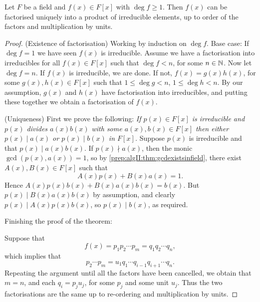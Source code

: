 \documentclass[10pt, a4paper]{article}
\begin{document}
\begin{theorem}
    Let $F$ be a field and $f(x) \in F[x]$ with $\deg{f} \geq 1$.
    Then $f(x)$ can be factorised uniquely into a product of irreducible elements,
    up to order of the factors and multiplication by units.

    \begin{proof}
        (Existence of factorisation)
        Working by induction on $\deg{f}$.
        Base case:
        If $\deg{f} = 1$ we have seen $f(x)$ is irreducible.
        Assume we have a factorisation into irreducibles for all $f(x) \in F[x]$ such that $\deg{f} < n$,
        for some $n \in \mathbb{N}$.
        Now let $\deg{f} = n$.
        If $f(x)$ is irreducible,
        we are done.
        If not,
        $f(x) = g(x)h(x)$,
        for some $g(x), h(x) \in F[x]$ such that $1 \leq \deg{g} < n$,
        $1 \leq \deg{h} < n$.
        By our assumption,
        $g(x)$ and $h(x)$ have factorisation into irreducibles,
        and putting these together we obtain a factorisation of $f(x)$.

        (Uniqueness)
        First we prove the following:
        \textit{If $p(x) \in F[x]$ is irreducible and $p(x)$ divides $a(x)b(x)$ with some $a(x), b(x) \in F[x]$ then either $p(x) \mid a(x)$ or $p(x) \mid b(x)$ in $F[x]$.}
        Suppose $p(x)$ is irreducible and that $p(x) \mid a(x)b(x)$.
        If $p(x) \nmid a(x)$,
        then the monic $\gcd(p(x), a(x)) = 1$,
        so by \autoref{prep:algII:thm:gcdexistsinfield},
        there exist $A(x), B(x) \in F[x]$ such that
        \[
        A(x)p(x) + B(x)a(x) = 1.
        \]
        Hence $A(x)p(x)b(x) + B(x)a(x)b(x) = b(x)$.
        But $p(x) \mid B(x)a(x)b(x)$ by assumption,
        and clearly $p(x) \mid A(x)p(x)b(x)$,
        so $p(x) \mid b(x)$,
        as required.

        Finishing the proof of the theorem:

        Suppose that
        \[
        f(x) = p_1p_2 \dotsi p_m = q_1q_2 \dotsi q_n,
        \]
        which implies that
        \[
        p_2\dotsi p_m = u_1q_1 \dotsi q_{i - 1}q_{i + 1}\dotsi q_n.
        \]
        Repeating the argument until all the factors have been cancelled,
        we obtain that $m = n$,
        and each $q_i = p_ju_j$,
        for some $p_j$ and some unit $u_j$.
        Thus the two factorisations are the same up to re-ordering and multiplication by units.
    \end{proof}
\end{theorem}
\end{document}

